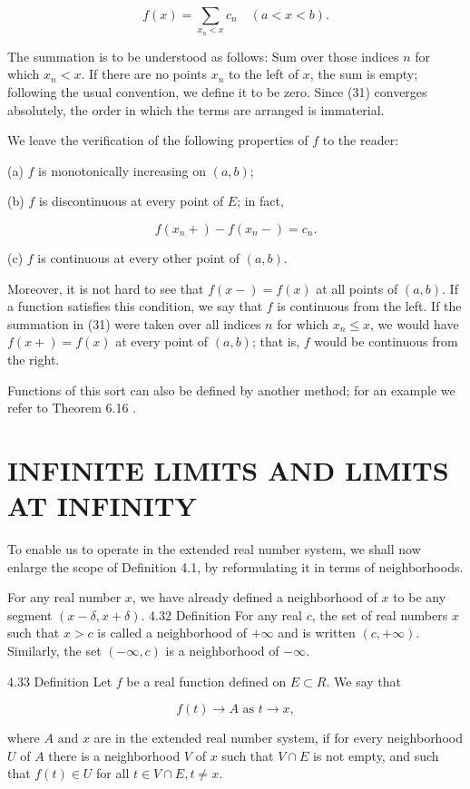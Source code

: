 \documentclass[10pt]{article}
\begin{document}
$$
f(x)=\sum_{x_{n}<x} c_{n} \quad(a<x<b) .
$$

The summation is to be understood as follows: Sum over those indices $n$ for which $x_{n}<x$. If there are no points $x_{n}$ to the left of $x$, the sum is empty; following the usual convention, we define it to be zero. Since (31) converges absolutely, the order in which the terms are arranged is immaterial.

We leave the verification of the following properties of $f$ to the reader:

(a) $f$ is monotonically increasing on $(a, b)$;

(b) $f$ is discontinuous at every point of $E$; in fact,

$$
f\left(x_{n}+\right)-f\left(x_{n}-\right)=c_{n} .
$$

(c) $f$ is continuous at every other point of $(a, b)$.

Moreover, it is not hard to see that $f(x-)=f(x)$ at all points of $(a, b)$. If a function satisfies this condition, we say that $f$ is continuous from the left. If the summation in (31) were taken over all indices $n$ for which $x_{n} \leq x$, we would have $f(x+)=f(x)$ at every point of $(a, b)$; that is, $f$ would be continuous from the right.

Functions of this sort can also be defined by another method; for an example we refer to Theorem 6.16 .

\section{INFINITE LIMITS AND LIMITS AT INFINITY}
To enable us to operate in the extended real number system, we shall now enlarge the scope of Definition 4.1, by reformulating it in terms of neighborhoods.

For any real number $x$, we have already defined a neighborhood of $x$ to be any segment $(x-\delta, x+\delta)$. 4.32 Definition For any real $c$, the set of real numbers $x$ such that $x>c$ is called a neighborhood of $+\infty$ and is written $(c,+\infty)$. Similarly, the set $(-\infty, c)$ is a neighborhood of $-\infty$.

4.33 Definition Let $f$ be a real function defined on $E \subset R$. We say that

$$
f(t) \rightarrow A \text { as } t \rightarrow x,
$$

where $A$ and $x$ are in the extended real number system, if for every neighborhood $U$ of $A$ there is a neighborhood $V$ of $x$ such that $V \cap E$ is not empty, and such that $f(t) \in U$ for all $t \in V \cap E, t \neq x$.
\end{document}
